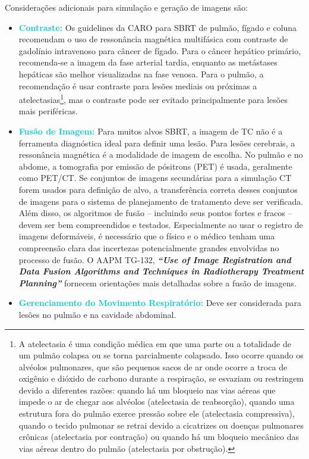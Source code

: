 \documentclass[11pt,a4paper]{article}
\begin{document}
	Considerações adicionais para simulação e geração de imagens são:

	\begin{itemize}[label=\textcolor{CarnationPink}{$\blacktriangleright$}]
		\item \textcolor{DarkTurquoise}{\textbf{Contraste:}} Os guidelines da CARO para SBRT de pulmão, fígado e coluna recomendam o uso de ressonância magnética multifásica com contraste de gadolínio intravenoso para câncer de fígado. Para o câncer hepático primário, recomenda-se a imagem da fase arterial tardia, enquanto as metástases hepáticas são melhor visualizadas na fase venosa. Para o pulmão, a recomendação é usar contraste para lesões mediais ou próximas a atelectasias\footnote{A atelectasia é uma condição médica em que uma parte ou a totalidade de um pulmão colapsa ou se torna parcialmente colapsado. Isso ocorre quando os alvéolos pulmonares, que são pequenos sacos de ar onde ocorre a troca de oxigênio e dióxido de carbono durante a respiração, se esvaziam ou restringem devido a diferentes razões: quando há um bloqueio nas vias aéreas que impede o ar de chegar aos alvéolos (atelectasia de reabsorção), quando uma estrutura fora do pulmão exerce pressão sobre ele (atelectasia compressiva), quando o tecido pulmonar se retrai devido a cicatrizes ou doenças pulmonares crônicas (atelectasia por contração) ou quando há um bloqueio mecânico das vias aéreas dentro do pulmão (atelectasia por obstrução). }, mas o contraste pode ser evitado principalmente para lesões mais periféricas.
		
		\item \textcolor{DarkTurquoise}{\textbf{Fusão de Imagem:}} Para muitos alvos SBRT, a imagem de TC não é a ferramenta diagnóstica ideal para definir uma lesão. Para lesões cerebrais, a ressonância magnética é a modalidade de imagem de escolha. No pulmão e no abdome, a tomografia por emissão de pósitrons (PET) é usada, geralmente como PET/CT. Se conjuntos de imagens secundárias para a simulação CT forem usados para definição de alvo, a transferência correta desses conjuntos de imagens para o sistema de planejamento de tratamento deve ser verificada. Além disso, os algoritmos de fusão -- incluindo seus pontos fortes e fracos -- devem ser bem compreendidos e testados. Especialmente ao usar o registro de imagens deformáveis, é necessário que o físico e o médico tenham uma compreensão clara das incertezas potencialmente grandes envolvidas no processo de fusão. O AAPM TG-132, \textit{\textbf{``Use of Image Registration and Data Fusion Algorithms and Techniques in Radiotherapy Treatment Planning''}} fornecem orientações mais detalhadas sobre a fusão de imagens.
		
		\item \textcolor{DarkTurquoise}{\textbf{Gerenciamento do Movimento Respiratório:}} Deve ser considerada para lesões no pulmão e na cavidade abdominal.
		
	\end{itemize}
	
\end{document}
